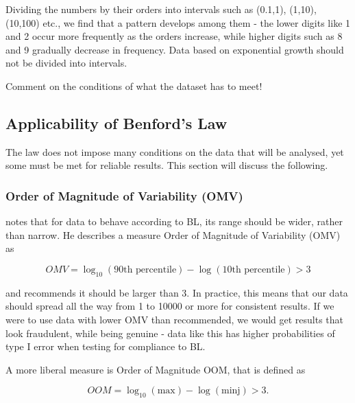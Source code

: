 Dividing the numbers by their orders into intervals such as (0.1,1), (1,10), (10,100) etc., we find that a pattern develops among them - the lower digits like 1 and 2 occur more frequently as the orders increase, while higher digits such as 8 and 9 gradually decrease in frequency. Data based on exponential growth should not be divided into intervals. \cite{kossovsky2014benford} %

\begin{koment}
Comment on the conditions of what the dataset has to meet! 
\end{koment}

\subsection{Applicability of Benford's Law}

The law does not impose many conditions on the data that will be analysed, yet some must be met for reliable results. This section will discuss the following. 

\subsubsection*{Order of Magnitude of Variability (OMV)}

\citeauthor{kossovsky2014benford} notes that for data to behave according to BL, its range should be wider, rather than narrow. He describes a measure Order of Magnitude of Variability (OMV) as 

\begin{equation}
    OMV = \log_{10}(\text{90th percentile}) - \log(\text{10th percentile}) > 3 
    \label{OMV}
\end{equation}

and recommends it should be larger than 3. In practice, this means that our data should spread all the way from 1 to 10000 or more for consistent results. If we were to use data with lower OMV than recommended, we would get results that look fraudulent, while being genuine - data like this has higher probabilities of type I error when testing for compliance to BL. 

A more liberal measure is Order of Magnitude OOM, that is defined as

\begin{equation}
    OOM = \log_{10}(\text{max}) - \log(\text{minj}) > 3. 
    \label{OOM}
\end{equation}


